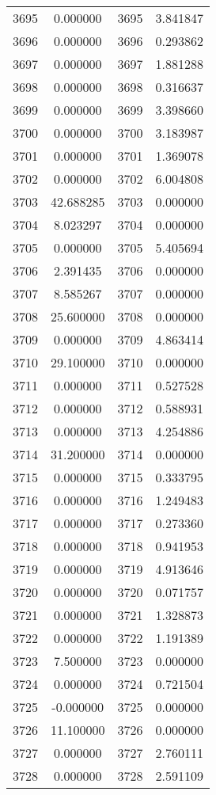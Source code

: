 \documentclass[12pt]{article}
\begin{document}
\begin{longtable}{@{}cccc@{}}
3695 & 0.000000 & 3695 & 3.841847 \\
3696 & 0.000000 & 3696 & 0.293862 \\
3697 & 0.000000 & 3697 & 1.881288 \\
3698 & 0.000000 & 3698 & 0.316637 \\
3699 & 0.000000 & 3699 & 3.398660 \\
3700 & 0.000000 & 3700 & 3.183987 \\
3701 & 0.000000 & 3701 & 1.369078 \\
3702 & 0.000000 & 3702 & 6.004808 \\
3703 & 42.688285 & 3703 & 0.000000 \\
3704 & 8.023297 & 3704 & 0.000000 \\
3705 & 0.000000 & 3705 & 5.405694 \\
3706 & 2.391435 & 3706 & 0.000000 \\
3707 & 8.585267 & 3707 & 0.000000 \\
3708 & 25.600000 & 3708 & 0.000000 \\
3709 & 0.000000 & 3709 & 4.863414 \\
3710 & 29.100000 & 3710 & 0.000000 \\
3711 & 0.000000 & 3711 & 0.527528 \\
3712 & 0.000000 & 3712 & 0.588931 \\
3713 & 0.000000 & 3713 & 4.254886 \\
3714 & 31.200000 & 3714 & 0.000000 \\
3715 & 0.000000 & 3715 & 0.333795 \\
3716 & 0.000000 & 3716 & 1.249483 \\
3717 & 0.000000 & 3717 & 0.273360 \\
3718 & 0.000000 & 3718 & 0.941953 \\
3719 & 0.000000 & 3719 & 4.913646 \\
3720 & 0.000000 & 3720 & 0.071757 \\
3721 & 0.000000 & 3721 & 1.328873 \\
3722 & 0.000000 & 3722 & 1.191389 \\
3723 & 7.500000 & 3723 & 0.000000 \\
3724 & 0.000000 & 3724 & 0.721504 \\
3725 & -0.000000 & 3725 & 0.000000 \\
3726 & 11.100000 & 3726 & 0.000000 \\
3727 & 0.000000 & 3727 & 2.760111 \\
3728 & 0.000000 & 3728 & 2.591109 \\

\end{longtable}
\end{document}
